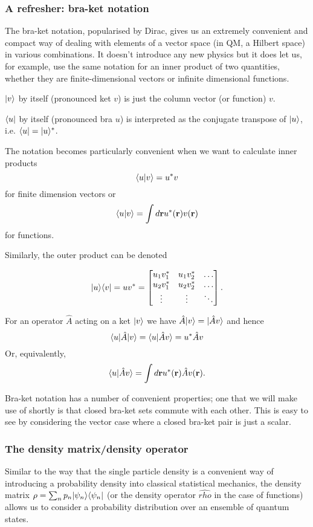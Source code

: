\subsubsection{A refresher: bra-ket notation}
The bra-ket notation, popularised by Dirac, gives us an extremely convenient and compact way of dealing with elements of a vector space (in QM, a Hilbert space) in various combinations. It doesn't introduce any new physics but it does let us, for example, use the same notation for an inner product of two quantities, whether they are finite-dimensional vectors or infinite dimensional functions.

$| v \rangle$ by itself (pronounced ket $v$) is just the column vector (or function) $v$.

$\langle u |$ by itself (pronounced bra $u$) is interpreted as the conjugate transpose of $| u \rangle$, i.e. $\langle u |=| u \rangle^*$.

The notation becomes particularly convenient when we want to calculate inner products
$$
	\langle u | v\rangle = u^*v
$$
for finite dimension vectors or 
$$
	\langle u | v\rangle =	\int d{\bf r}u^*({\bf r})v({\bf r})
$$
for functions.

Similarly, the outer product can be denoted 

$$
| u \rangle\langle v |=uv^* =
\begin{bmatrix}
    u_1v^*_1 & u_1v^*_2  & \dots \\
    u_2v^*_1 & u_2v^*_2  & \dots   \\
    \vdots & \vdots & \ddots 
\end{bmatrix}.
$$

For an operator $\hat{A}$ acting on a ket $| v \rangle$ we have $\hat{A}| v \rangle = | \hat{A}v \rangle$ and hence 
$$
	\langle u |\hat{A}| v \rangle=\langle u | \hat{A}v\rangle = u^*\hat{A}v
$$
Or, equivalently,  
$$
	\langle u | \hat{A}v\rangle = \int d{\bf r} u^*({\bf r}) \hat{A} v({\bf r}).
$$

Bra-ket notation has a number of convenient properties; one that we will make use of shortly is that closed bra-ket sets commute with each other. This is easy to see by considering the vector case where a closed bra-ket pair is just a scalar.

\subsubsection*{The density matrix/density operator}
Similar to the way that the single particle density is a convenient way of introducing a probability density into classical statistical mechanics, the density matrix $\rho = \sum_n p_n| \psi_n \rangle\langle \psi_n |$ (or the density operator $\hat{rho}$ in the case of functions) allows us to consider a probability distribution over an ensemble of quantum states.


